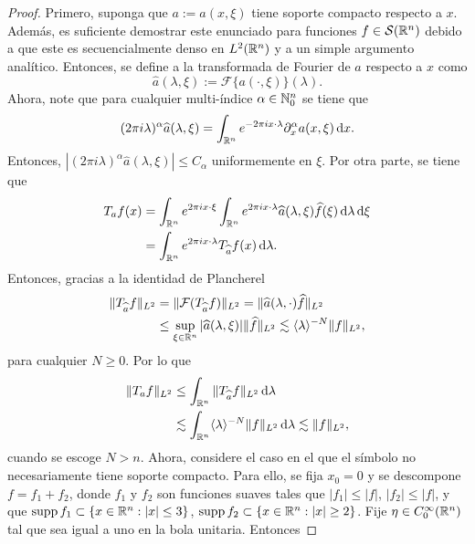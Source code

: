 \begin{proof}
	Primero, suponga que $a:=a(x, \xi)$ tiene soporte compacto respecto a $x$. Además, es suficiente demostrar este enunciado para funciones $f\in\mathcal{S}(\mathbb{R}^n)$ debido a que este es secuencialmente denso en $L^2(\mathbb{R}^n)$ y a un simple argumento analítico. Entonces, se define a la transformada de Fourier de $a$ respecto a $x$ como 
	\begin{equation*}
		\widehat{a}(\lambda, \xi) := \mathcal{F}\{a(\cdot, \xi)\}(\lambda).
	\end{equation*}
	Ahora, note que para cualquier multi-índice $\alpha\in\mathbb{N}^n_0$ se tiene que 
	\begin{equation*}
		(2\pi i\lambda)^\alpha \widehat{a}(\lambda, \xi) = 
		\int_{\mathbb{R}^n} e^{-2\pi ix\cdot\lambda}\partial^\alpha_x a(x, \xi) \mathop{}\!\mathrm{d} x.
	\end{equation*}
	Entonces, $|(2\pi i\lambda)^\alpha\widehat{a}(\lambda, \xi)|\leq C_\alpha$ uniformemente en $\xi$. Por otra parte, se tiene que
	\begin{align*}
		T_af(x) &= \int_{\mathbb{R}^n} e^{2\pi ix\cdot\xi} \int_{\mathbb{R}^n}e^{2\pi ix\cdot\lambda} 
		\widehat{a}(\lambda, \xi) \widehat{f}(\xi)\mathop{}\!\mathrm{d} \lambda \mathop{}\!\mathrm{d} \xi \\
		& = \int_{\mathbb{R}^n} e^{2\pi ix\cdot\lambda} T_{\widehat{a}} f(x) \mathop{}\!\mathrm{d} \lambda.
	\end{align*}
	Entonces, gracias a la identidad de Plancherel 
	\begin{align*}
		\|T_{\widehat{a}}f\|_{L^2}  &= \|\mathcal{F}(T_{\widehat{a}}f)\|_{L^2} = 
		\|\widehat{a}(\lambda, \cdot)\widehat{f}\|_{L^2} \\
		& \leq \sup_{\xi\in\mathbb{R}^n}|\widehat{a}(\lambda, \xi)|\|\widehat{f}\|_{L^2} 
		\lesssim \langle\lambda\rangle^{-N}\|f\|_{L^2},
	\end{align*}
	para cualquier $N\geq0$. Por lo que
	\begin{align*}
		\|T_af\|_{L^2} & \leq \int_{\mathbb{R}^n}\|T_{\widehat{a}}f\|_{L^2} \mathop{}\!\mathrm{d} \lambda \\
		& \lesssim \int_{\mathbb{R}^n}\langle\lambda\rangle^{-N}\|f\|_{L^2} \mathop{}\!\mathrm{d} \lambda \lesssim \|f\|_{L^2},
	\end{align*}
	cuando se escoge $N>n$. Ahora, considere el caso en el que el símbolo no necesariamente tiene soporte compacto. Para ello, se fija $x_0=0$ y se descompone $f =f_1+f_2$, donde $f_1$ y $f_2$ son funciones suaves tales que $|f_1|\leq|f|$, $|f_2|\leq|f|$, y que $\operatorname{supp} f_1 \subset \{x\in\mathbb{R}^n:|x|\leq3\}$, $\operatorname{supp} f_2\subset \{x\in\mathbb{R}^n:|x|\geq2\}$. Fije $\eta\in C^\infty_0(\mathbb{R}^n)$ tal que sea igual a uno en la bola unitaria. Entonces 

\end{proof}
